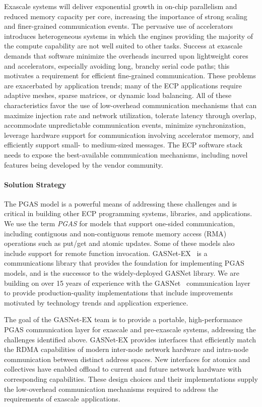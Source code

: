 Exascale systems will deliver exponential growth in on-chip parallelism and
reduced memory capacity per core, 
increasing the importance of strong
scaling and finer-grained communication events.  
The pervasive use of accelerators introduces heterogeneous systems in which
the engines providing the majority of the compute capability are not well
suited to other tasks.
Success at exascale demands that
software minimize the overheads incurred upon lightweight cores and accelerators,
especially avoiding long, branchy serial code paths; 
this motivates a requirement for efficient
fine-grained communication.
These problems are exacerbated by application trends; many of the ECP applications require
adaptive meshes, sparse matrices,
or dynamic load balancing.
All of these characteristics favor the use of
low-overhead communication mechanisms that
can maximize injection rate and network utilization, tolerate latency through
overlap, accommodate unpredictable communication events, minimize synchronization,
leverage hardware support for communication involving accelerator memory,
and efficiently support small- to medium-sized messages. The ECP software stack
needs to expose the best-available communication mechanisms, including novel
features being developed by the vendor community.

\paragraph{Solution Strategy}

The PGAS model is a powerful means of addressing these
challenges and is critical in building other ECP programming systems,
libraries, and applications.  We use the term {\em PGAS} for models that support
one-sided communication, 
including contiguous and non-contiguous remote memory access (RMA) operations such as put/get
and atomic updates. Some of these models also include support for remote function invocation.
GASNet-EX~\cite{gasnet-lcpc18} is a communications library that provides the foundation for implementing
PGAS models, and is the successor to the widely-deployed GASNet library.
We are building on over 15 years of experience with the GASNet~\cite{gasnet-spec,gasnet-site}
communication layer to provide production-quality implementations that include
improvements motivated by
technology trends and application experience.  

The goal of the GASNet-EX team is to provide a portable, high-performance PGAS
communication layer for exascale and pre-exascale systems, addressing the challenges
identified above.
GASNet-EX provides interfaces that efficiently match the RDMA capabilities of modern
inter-node network hardware and intra-node communication between distinct address spaces.
New interfaces for atomics and collectives have enabled offload to current
and future network hardware with corresponding capabilities.
These design choices and their implementations supply the low-overhead communication
mechanisms required to address the requirements of exascale applications.

